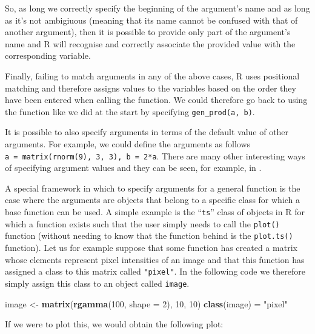 \documentclass[12pt,]{krantz}
\newenvironment{Shaded}{\begin{snugshade}}{\end{snugshade}}
\newcommand{\KeywordTok}[1]{\textcolor[rgb]{0.27,0.27,0.27}{\textbf{#1}}}
\newcommand{\DataTypeTok}[1]{\textcolor[rgb]{0.27,0.27,0.27}{#1}}
\newcommand{\DecValTok}[1]{\textcolor[rgb]{0.06,0.06,0.06}{#1}}
\newcommand{\StringTok}[1]{\textcolor[rgb]{0.5,0.5,0.5}{#1}}
\newcommand{\NormalTok}[1]{#1}
\let\BeginKnitrBlock\begin \let\EndKnitrBlock\end
\begin{document}
So, as long we correctly specify the beginning of the argument's name
and as long as it's not ambigiuous (meaning that its name cannot be
confused with that of another argument), then it is possible to provide
only part of the argument's name and R will recognise and correctly
associate the provided value with the corresponding variable.

Finally, failing to match arguments in any of the above cases, R uses
positional matching and therefore assigns values to the variables based
on the order they have been entered when calling the function. We could
therefore go back to using the function like we did at the start by
specifying \texttt{gen\_prod(a,\ b)}.

\BeginKnitrBlock{rmdnote}
It is possible to also specify arguments in terms of the default value
of other arguments. For example, we could define the arguments as
follows \texttt{a\ =\ matrix(rnorm(9),\ 3,\ 3),\ b\ =\ 2*a}. There are
many other interesting ways of specifying argument values and they can
be seen, for example, in \citet{wickham2014advanced} .
\EndKnitrBlock{rmdnote}

A special framework in which to specify arguments for a general function
is the case where the arguments are objects that belong to a specific
class for which a base function can be used. A simple example is the
``\texttt{ts}'' class of objects in R for which a function exists such
that the user simply needs to call the \texttt{plot()} function (without
needing to know that the function behind is the \texttt{plot.ts()}
function). Let us for example suppose that some function has created a
matrix whose elements represent pixel intensities of an image and that
this function has assigned a class to this matrix called
\texttt{"pixel"}. In the following code we therefore simply assign this
class to an object called \texttt{image}.

\begin{Shaded}
\begin{Highlighting}[]
\NormalTok{image <-}\StringTok{ }\KeywordTok{matrix}\NormalTok{(}\KeywordTok{rgamma}\NormalTok{(}\DecValTok{100}\NormalTok{, }\DataTypeTok{shape =} \DecValTok{2}\NormalTok{), }\DecValTok{10}\NormalTok{, }\DecValTok{10}\NormalTok{)}
\KeywordTok{class}\NormalTok{(image) =}\StringTok{ "pixel"}
\end{Highlighting}
\end{Shaded}

If we were to plot this, we would obtain the following plot:
\end{document}
